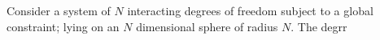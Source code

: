 Consider a system of $N$ interacting degrees of freedom subject to a global constraint; lying on an $N$ dimensional sphere of radius $N$. The degrr